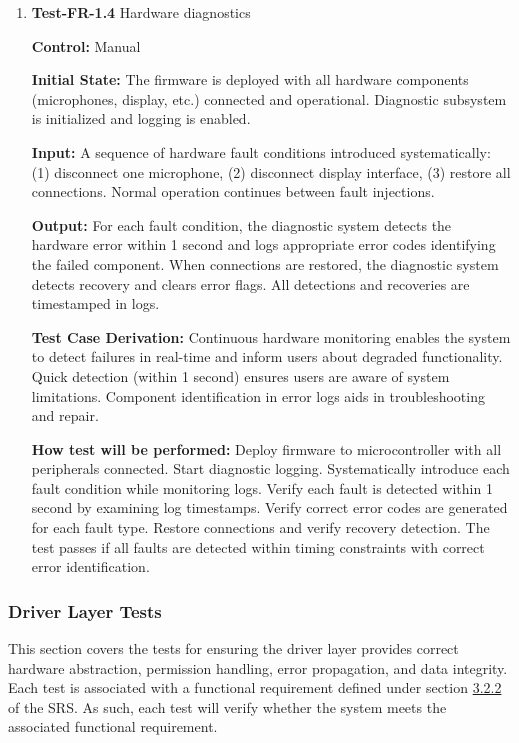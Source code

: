 \documentclass[12pt, titlepage]{article}
\begin{document}
\begin{enumerate}
\item{\textbf{Test-FR-1.4} Hardware diagnostics\\}

\textbf{Control:} Manual
					
\textbf{Initial State:} 
The firmware is deployed with all hardware components (microphones, display,
etc.) connected and operational. Diagnostic subsystem is initialized and logging
is enabled.
					
\textbf{Input:}
A sequence of hardware fault conditions introduced systematically: (1)
disconnect one microphone, (2) disconnect display interface, (3) restore all
connections. Normal operation continues between fault injections.
					
\textbf{Output:}
For each fault condition, the diagnostic system detects the hardware error
within 1 second and logs appropriate error codes identifying the failed
component. When connections are restored, the diagnostic system detects recovery
and clears error flags. All detections and recoveries are timestamped in logs.

\textbf{Test Case Derivation:} 
Continuous hardware monitoring enables the system to detect failures in
real-time and inform users about degraded functionality. Quick detection (within
1 second) ensures users are aware of system limitations. Component
identification in error logs aids in troubleshooting and repair.
					
\textbf{How test will be performed:}
Deploy firmware to microcontroller with all peripherals connected. Start
diagnostic logging. Systematically introduce each fault condition while
monitoring logs. Verify each fault is detected within 1 second by examining log
timestamps. Verify correct error codes are generated for each fault type.
Restore connections and verify recovery detection. The test passes if all faults
are detected within timing constraints with correct error identification.

\end{enumerate}

\subsubsection{Driver Layer Tests}

This section covers the tests for ensuring the driver layer provides correct
hardware abstraction, permission handling, error propagation, and data
integrity. Each test is associated with a functional requirement defined under
section \hyperref[SRS-sec:FR2]{3.2.2} of the SRS. As such, each test will verify
whether the system meets the associated functional requirement.
\end{document}
